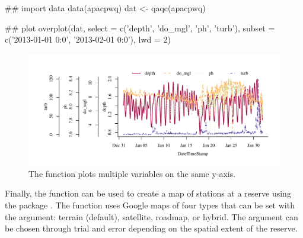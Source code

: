\begin{example}
## import data
data(apacpwq)
dat <- qaqc(apacpwq)

## plot
overplot(dat, select = c('depth', 'do_mgl', 'ph', 'turb'),
  subset = c('2013-01-01 0:0', '2013-02-01 0:0'), lwd = 2)
\end{example}
\begin{figure}[!h]

{\centering \includegraphics[width=\textwidth]{overplot-1} 

}

\caption[The  function plots multiple variables on the same y-axis]{The  function plots multiple variables on the same y-axis.}\label{fig:overplot}
\end{figure}

Finally, the  function can be used to create a map of stations at a reserve using the  package \citep{Kahle13}. The function uses Google maps of four types that can be set with the  argument: terrain (default), satellite, roadmap, or hybrid.  The  argument can be chosen through trial and error depending on the spatial extent of the reserve.

